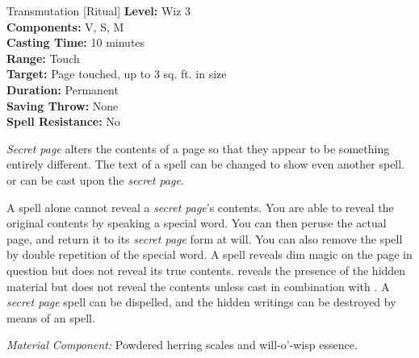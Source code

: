 {Transmutation [Ritual]}
{
	\textbf{Level:}
	Wiz 3\\
	\textbf{Components:}
	V, S, M\\
	\textbf{Casting Time:}
	10 minutes\\
	\textbf{Range:}
	Touch\\
	\textbf{Target:}
	Page touched, up to 3 sq. ft. in size\\
	\textbf{Duration:}
	Permanent\\
	\textbf{Saving Throw:}
	None\\
	\textbf{Spell Resistance:}
	No\\
}
{
	\emph{Secret page} alters the contents of a page so that they appear to be something entirely different. The text of a spell can be changed to show even another spell.  or  can be cast upon the \emph{secret page}.

	A  spell alone cannot reveal a \emph{secret page}'s contents. You are able to reveal the original contents by speaking a special word. You can then peruse the actual page, and return it to its \emph{secret page} form at will. You can also remove the spell by double repetition of the special word. A  spell reveals dim magic on the page in question but does not reveal its true contents.  reveals the presence of the hidden material but does not reveal the contents unless cast in combination with . A \emph{secret page} spell can be dispelled, and the hidden writings can be destroyed by means of an  spell.

	\textit{Material Component:}
	Powdered herring scales and will-o'-wisp essence.

}
